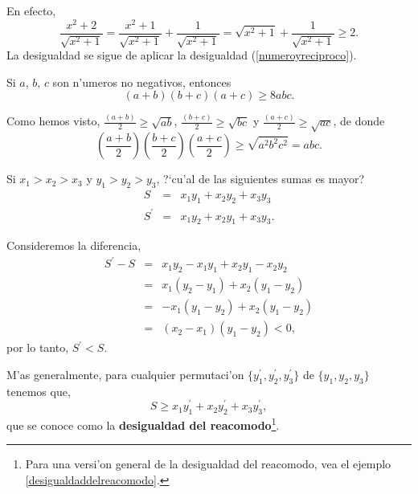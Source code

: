 En efecto,
$$
    \frac{x^2+2}{\sqrt{x^2+1}}  =  \frac{x^2+1}{\sqrt{x^2+1}}+\frac{1}{\sqrt{x^2+1}}
                                =  \sqrt{x^2+1}+\frac{1}{\sqrt{x^2+1}} \geq 2.
$$
La desigualdad se sigue de aplicar la desigualdad (\ref{numeroyreciproco}).

\begin{ejemplo}
Si $a$, $b$, $c$ son n'umeros no negativos, entonces
$$
          (a+b)(b+c)(a+c)\geq 8abc.
$$
\end{ejemplo}
\noindent Como hemos visto, $\frac{(a+b)}{2}\geq \sqrt{ab}$, $\frac{(b+c)}{2}\geq \sqrt{bc}$\; y $\frac{(a+c)}{2}\geq \sqrt{ac}$, de donde
$$
    \left (\frac{a+b}{2}\right )\left (\frac{b+c}{2}\right )\left (\frac{a+c}{2}\right ) \geq\sqrt{a^2b^2c^2}=abc.
$$

\begin{ejemplo}
\label{ejemploreacomodo}
Si $x_1>x_2>x_3$ y $y_1>y_2>y_3$, ?`cu'al de las siguientes sumas es mayor?
\begin{eqnarray*}
     S & = & x_1y_1+x_2y_2+x_3y_3\\
		 S^\prime & = & x_1y_2+x_2y_1+x_3y_3.
\end{eqnarray*}		
\end{ejemplo}
Consideremos la diferencia,
\begin{eqnarray*}
     S^\prime- S & = & x_1y_2-x_1y_1+x_2y_1-x_2y_2\\
               	 & = & x_1(y_2-y_1)+x_2(y_1-y_2)\\
		  & = & -x_1(y_1-y_2)+x_2(y_1-y_2)\\
		 & = & (x_2-x_1)(y_1-y_2) < 0,
\end{eqnarray*}		
por lo tanto, $S^\prime < S$.

\noindent M'as generalmente, para cualquier permutaci'on $\{y^\prime_1,y^\prime_2,y^\prime_3\}$ de
$\{y_1,y_2,y_3\}$ tenemos que,
\begin{equation}
         S\geq x_1y^\prime_1+x_2y^\prime_2+x_3y^\prime_3,
\label{desigualdadreacomodo}
\end{equation} que se conoce como la 
{\bf desigualdad del reacomodo}\footnote{Para una versi'on general de la 
desigualdad del reacomodo, vea el ejemplo \ref{desigualdaddelreacomodo}.}. 

\vei		


